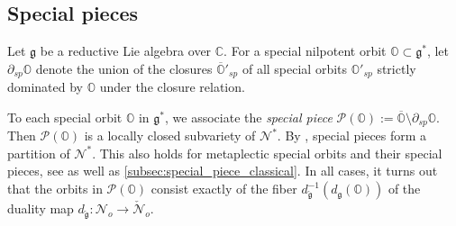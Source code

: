 \documentclass[11pt, a4paper]{amsart}
\newcommand{\C}{\mathbb{C}}
\newcommand{\g}{\mathfrak{g}}
\newcommand{\orb}{\mathbb{O}}
\newcommand{\fg}{\mathfrak{g}}
\newcommand{\ckfg}{{\check{\fg}}}
\newcommand{\cN}{\mathcal{N}}
\newcommand{\cP}{\mathcal{P}}
\theoremstyle{definition}
\numberwithin{equation}{section}
\begin{document}
\subsection{Special pieces}

Let $\g$ be a reductive Lie algebra over $\C$. 
For a special nilpotent orbit $\orb \subset \fg^*$, let $\partial_{sp} \orb$ denote the union of the closures $\overline{\orb}'_{sp}$ of all special orbits $\orb'_{sp}$ strictly dominated by $\orb$ under the closure relation. 

To each special orbit $\orb$ in $\fg^*$, we associate the \emph{special piece} $\cP(\orb) := \overline{\orb} \setminus \partial_{sp} \orb$. Then $\cP(\orb)$ is a locally closed subvariety of $\cN^*$. By \cite[Chapitre III. 1 \& 2]{Spaltenstein}, special pieces form a partition of $\cN^*$. This also holds for metaplectic special orbits and their special pieces, see \cite[Section 2.4]{JLS:Duality} as well as \cref{subsec:special_piece_classical}. In all cases, it turns out that the orbits in $\cP(\orb)$ consist exactly of the fiber $d_{\ckfg}^{-1} (d_{\fg}(\orb))$ of the duality map $d_{\ckfg}: \cN_o \to \check{\cN}_o$.
\end{document}
